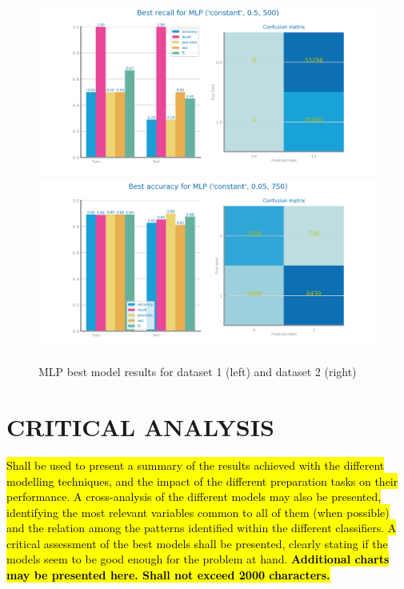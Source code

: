 \documentclass[10pt]{extarticle}
\newcommand{\ctext}[3][RGB]{%
  \begingroup
  \definecolor{hlcolor}{#1}{#2}\sethlcolor{hlcolor}%
  \hl{#3}%
  \endgroup
}
\begin{document}
\begin{figure}[H]
\centering\includegraphics[scale=0.4]{images/dataset1/models_evaluation/CovidPos_mlp_MLP_best_recall_eval.png}
\includegraphics[scale=0.4]{images/dataset2/models_evaluation/Credit_Score_mlp_MLP_best_accuracy_eval.png}
\caption{MLP best model results for dataset 1 (left) and dataset 2 (right)}
\end{figure}

\section{CRITICAL ANALYSIS}
\ctext[RGB]{190,190,190}{Shall be used to present a summary of the results achieved with the different modelling techniques, and the impact of the different preparation tasks on their performance. 
A cross-analysis of the different models may also be presented, identifying the most relevant variables common to all of them (when possible) and the relation among the patterns identified within the different classifiers.
A critical assessment of the best models shall be presented, clearly stating if the models seem to be good enough for the problem at hand. \textbf{Additional charts may be presented here.  Shall not exceed 2000 characters.}}
\end{document}
